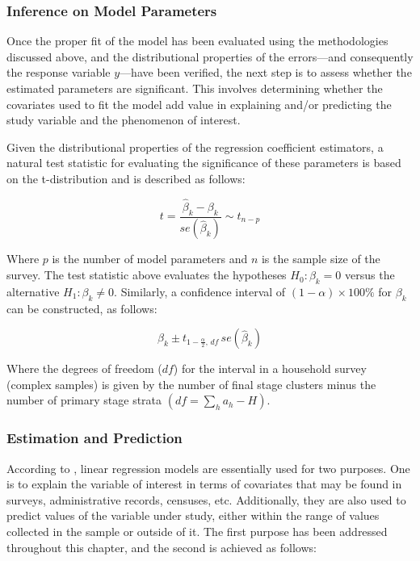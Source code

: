 \documentclass[
  12pt,
]{book}
\begin{document}
\hypertarget{inference-on-model-parameters}{%
\subsubsection{Inference on Model Parameters}\label{inference-on-model-parameters}}

Once the proper fit of the model has been evaluated using the methodologies discussed above, and the distributional properties of the errors---and consequently the response variable \(y\)---have been verified, the next step is to assess whether the estimated parameters are significant. This involves determining whether the covariates used to fit the model add value in explaining and/or predicting the study variable and the phenomenon of interest.

Given the distributional properties of the regression coefficient estimators, a natural test statistic for evaluating the significance of these parameters is based on the t-distribution and is described as follows:

\[
t = \frac{\hat{\beta}_{k}-\beta_{k}}{se\left(\hat{\beta}_{k}\right)}\sim t_{n-p}
\]

Where \(p\) is the number of model parameters and \(n\) is the sample size of the survey. The test statistic above evaluates the hypotheses \(H_{0}:\beta_{k}=0\) versus the alternative \(H_{1}:\beta_{k}\neq0\). Similarly, a confidence interval of \((1-\alpha)\times100\%\) for \(\beta_{k}\) can be constructed, as follows:

\[
\hat{\beta}_{k}\pm t_{1-\frac{\alpha}{2},\,df}\,se\left(\hat{\beta}_{k}\right)
\]

Where the degrees of freedom (\(df\)) for the interval in a household survey (complex samples) is given by the number of final stage clusters minus the number of primary stage strata \(\left(df=\sum_{h}a_{h}-H\right)\).

\hypertarget{estimation-and-prediction}{%
\subsubsection{Estimation and Prediction}\label{estimation-and-prediction}}

According to \citet{neter1996applied}, linear regression models are essentially used for two purposes. One is to explain the variable of interest in terms of covariates that may be found in surveys, administrative records, censuses, etc. Additionally, they are also used to predict values of the variable under study, either within the range of values collected in the sample or outside of it. The first purpose has been addressed throughout this chapter, and the second is achieved as follows:
\end{document}
